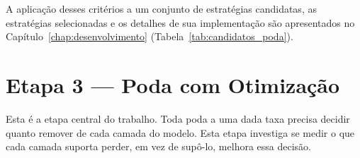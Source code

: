 
A aplicação desses critérios a um conjunto de estratégias candidatas, as estratégias
selecionadas e os detalhes de sua implementação são apresentados no
Capítulo~\ref{chap:desenvolvimento} (Tabela~\ref{tab:candidatos_poda}).

\section{Etapa 3 --- Poda com Otimização}\label{sec:metodologia_poda_com}

Esta é a etapa central do trabalho. Toda poda a uma dada taxa precisa decidir quanto
remover de cada camada do modelo. Esta etapa investiga se medir o que cada camada suporta
perder, em vez de supô-lo, melhora essa decisão.

